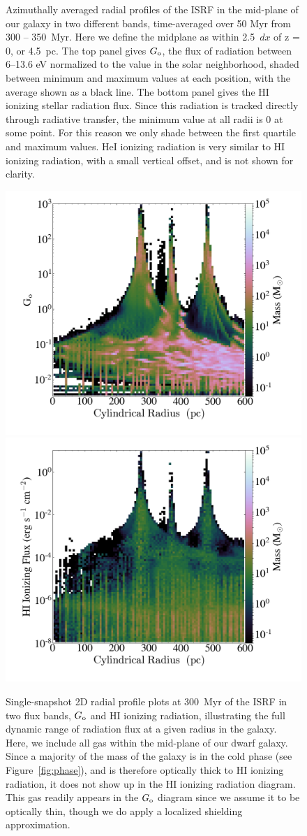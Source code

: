 \documentclass[fleqn,usenatbib,useAMS]{mnras}
\begin{document}
\begin{figure}
\caption{
Azimuthally averaged radial profiles of the ISRF in the mid-plane of our galaxy in two different bands, time-averaged over 50 Myr from 300 -- 350~Myr. Here we define the midplane as within 2.5~$dx$ of z = 0, or 4.5~pc. The top panel gives $G_{\rm o}$, the flux of radiation between 6--13.6 eV normalized to the value in the solar neighborhood, shaded between minimum and maximum values at each position, with the average shown as a black line. The bottom panel gives the HI ionizing stellar radiation flux. Since this radiation is tracked directly through radiative transfer, the minimum value at all radii is 0 at some point. For this reason we only shade between the first quartile and maximum values. HeI ionizing radiation is very similar to HI ionizing radiation, with a small vertical offset, and is not shown for clarity.}
\label{fig:ISRF}
\end{figure}

\begin{figure}
\includegraphics[width=0.45\linewidth]{g_o_2D_phase}
\includegraphics[width=0.45\linewidth]{q_o_2D_phase}
\caption{Single-snapshot 2D radial profile plots at 300~Myr of the ISRF in two flux bands, $G_{\rm o}$ and HI ionizing radiation, illustrating the full dynamic range of radiation flux at a given radius in the galaxy. Here, we include all gas within the mid-plane of our dwarf galaxy. Since a majority of the mass of the galaxy is in the cold phase (see Figure~\ref{fig:phase}), and is therefore optically thick to HI ionizing radiation, it does not show up in the HI ionizing radiation diagram. This gas readily appears in the $G_{\rm o}$ diagram since we assume it to be optically thin, though we do apply a localized shielding approximation.}
\label{fig:ISRF_2D}
\end{figure}
\end{document}
